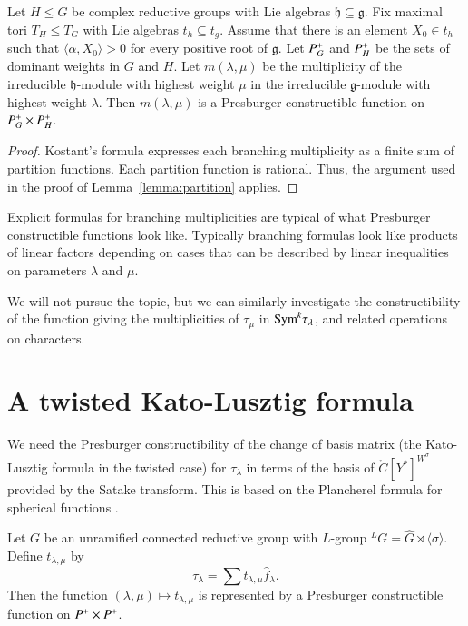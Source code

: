 \begin{lemma} Let $H\le G$ be complex reductive groups with Lie algebras ${\mathfrak h}\subseteq {\mathfrak g}$.
Fix maximal tori $T_H\le T_G$ with Lie algebras $t_h\subseteq t_g$.  Assume that there is an element
$X_0\in t_h$ such that $\langle \alpha,X_0\rangle>0$ for every positive root of ${\mathfrak g}$.
Let $P^+_G$ and $P^+_H$ be the sets of dominant weights in $G$ and $H$.  Let $m(\lambda,\mu)$
be the multiplicity of the irreducible $\mathfrak h$-module with highest weight $\mu$ in the irreducible
$\mathfrak g$-module with highest weight $\lambda$.  Then $m(\lambda,\mu)$ is a Presburger constructible
function on $P^+_G\times P^+_H$.
\end{lemma}

\begin{proof}  Kostant's formula expresses each branching multiplicity as a finite sum of partition
functions.  Each partition function is rational.  
Thus, the argument used in the proof of Lemma~\ref{lemma:partition} applies.
\end{proof}

Explicit formulas for branching multiplicities are typical of what Presburger constructible functions look like.
Typically branching formulas look like products of linear factors depending on cases that can be
described by linear inequalities on parameters $\lambda$ and $\mu$.


We will not pursue the topic, but we can similarly investigate the constructibility of the function giving the
multiplicities of $\tau_\mu$ in ${\operatorname{Sym}}^k \tau_\lambda$, and related operations on characters.




\section{A twisted Kato-Lusztig formula}

We need the Presburger constructibility of the change of basis matrix (the Kato-Lusztig formula \cite{kato1982spherical} in the twisted case) for 
$\tau_\lambda$ in terms of the basis of $\ring{C}[Y^*]^{W^\sigma}$ provided by the Satake transform.  This is based on the Plancherel formula
for spherical functions \cite{macdonaldspherical}.

\begin{conjecture}\label{conj:kato}  Let $G$ be an unramified connected reductive group with $L$-group ${}^LG = \hat G \rtimes \langle \sigma\rangle$.
Define $t_{\lambda,\mu}$ by
\begin{equation}\label{eqn:kato}
\tau_\lambda = \sum t_{\lambda,\mu} \hat f_\lambda.
\end{equation}
Then the function $(\lambda,\mu)\mapsto t_{\lambda,\mu}$ is represented by a Presburger constructible function on $P^+\times P^+$.
\end{conjecture}

